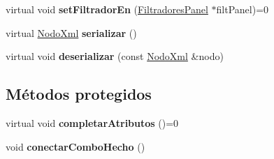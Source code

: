 \begin{DoxyCompactItemize}
\item 
\hypertarget{classFiltradorConfigModelo_a80cca4f94ccffd75b8022d73e46da642}{virtual void {\bfseries set\-Filtrador\-En} (\hyperlink{classFiltradoresPanel}{\-Filtradores\-Panel} $\ast$filt\-Panel)=0}\label{classFiltradorConfigModelo_a80cca4f94ccffd75b8022d73e46da642}

\item 
\hypertarget{classFiltradorConfigModelo_a0994bf3080dcad82bdbabe433e2a4de0}{virtual \hyperlink{classTiXmlElement}{\-Nodo\-Xml} {\bfseries serializar} ()}\label{classFiltradorConfigModelo_a0994bf3080dcad82bdbabe433e2a4de0}

\item 
\hypertarget{classFiltradorConfigModelo_a91c5fc88daee14e804531af8fc8e2057}{virtual void {\bfseries deserializar} (const \hyperlink{classTiXmlElement}{\-Nodo\-Xml} \&nodo)}\label{classFiltradorConfigModelo_a91c5fc88daee14e804531af8fc8e2057}

\end{DoxyCompactItemize}
\subsection*{\-Métodos protegidos}
\begin{DoxyCompactItemize}
\item 
\hypertarget{classFiltradorConfigModelo_abfc6c03689b768c273f58ab7d0ac4cd5}{virtual void {\bfseries completar\-Atributos} ()=0}\label{classFiltradorConfigModelo_abfc6c03689b768c273f58ab7d0ac4cd5}

\item 
\hypertarget{classFiltradorConfigModelo_abe052870e7ee1ca6222c2cd730281683}{void {\bfseries conectar\-Combo\-Hecho} ()}\label{classFiltradorConfigModelo_abe052870e7ee1ca6222c2cd730281683}

\end{DoxyCompactItemize}
